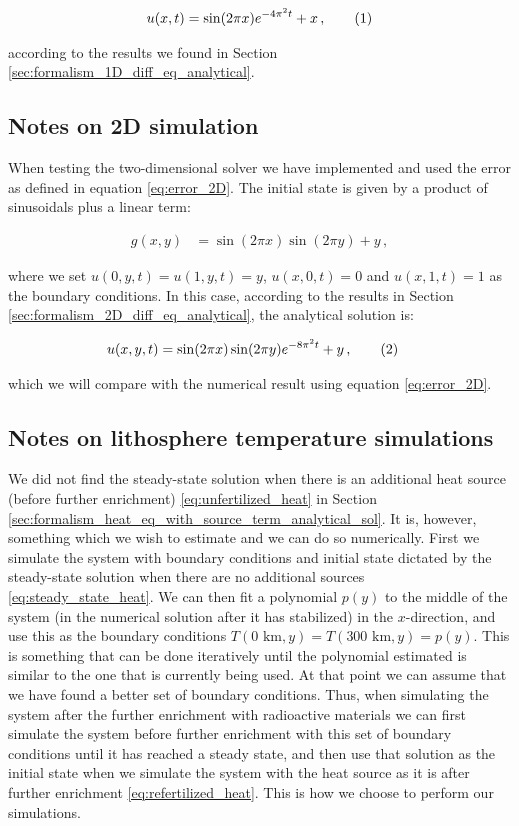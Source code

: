 \documentclass[reprint,english,notitlepage]{revtex4-1}  %
\newcommand\numberthis{\addtocounter{equation}{1}\tag{\theequation}}
\begin{document}
\begin{align*}
u(x,t) = \sin(2\pi x)e^{-4\pi^2 t} + x \, , \numberthis \label{eq:analytical_1D}
\end{align*} 

according to the results we found in Section \ref{sec:formalism_1D_diff_eq_analytical}.


\subsection{Notes on 2D simulation} \label{sec:method_2D_sim}

When testing the two-dimensional solver we have implemented and used the error as defined in equation \eqref{eq:error_2D}. The initial state is given by a product of sinusoidals plus a linear term:

\begin{align*}
g(x,y) &= \sin(2\pi x) \sin (2\pi y) + y \, ,
\end{align*}

where we set $u(0,y,t) = u(1,y,t) = y$, $u(x,0,t) = 0$ and $u(x,1,t) = 1$ as the boundary conditions. In this case, according to the results in Section \ref{sec:formalism_2D_diff_eq_analytical}, the analytical solution is:

\begin{align*}
u(x,y,t) &= \sin(2\pi x) \sin(2\pi y) e^{-8\pi^2 t} + y \, , \numberthis \label{eq:analytical_2D}
\end{align*}

which we will compare with the numerical result using equation \eqref{eq:error_2D}.


\subsection{Notes on lithosphere temperature simulations} \label{sec:method_heat_sim}

We did not find the steady-state solution when there is an additional heat source (before further enrichment) \eqref{eq:unfertilized_heat} in Section \ref{sec:formalism_heat_eq_with_source_term_analytical_sol}.
It is, however, something which we wish to estimate and we can do so numerically. First we simulate the system with boundary conditions and initial state dictated by the steady-state solution when there are no additional sources \eqref{eq:steady_state_heat}. We can then fit a polynomial $p(y)$ to the middle of the system (in the numerical solution after it has stabilized) in the $x$-direction, and use this as the boundary conditions $T(0 \text{ km},y) = T(300 \text{ km},y) = p(y)$. This is something that can be done iteratively until the polynomial estimated is similar to the one that is currently being used. At that point we can assume that we have found a better set of boundary conditions. Thus, when simulating the system after the further enrichment with radioactive materials we can first simulate the system before further enrichment with this set of boundary conditions until it has reached a steady state, and then use that solution as the initial state when we simulate the system with the heat source as it is after further enrichment \eqref{eq:refertilized_heat}. This is how we choose to perform our simulations.
\end{document}
